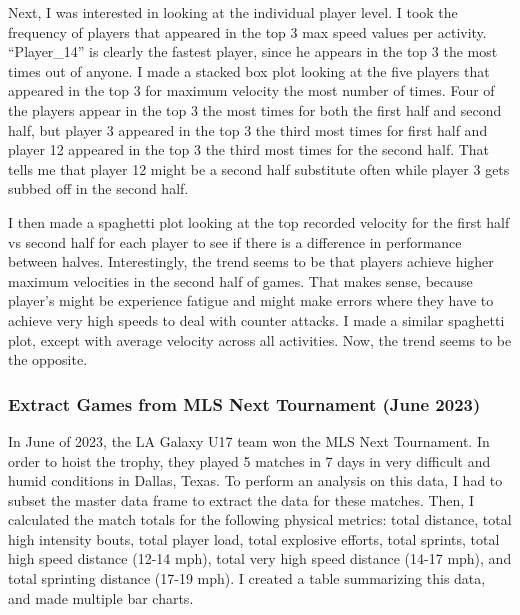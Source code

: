 \documentclass[
  letterpaper,
  DIV=11,
  numbers=noendperiod]{scrartcl}
\begin{document}
Next, I was interested in looking at the individual player level. I took
the frequency of players that appeared in the top 3 max speed values per
activity. ``Player\_14'' is clearly the fastest player, since he appears
in the top 3 the most times out of anyone. I made a stacked box plot
looking at the five players that appeared in the top 3 for maximum
velocity the most number of times. Four of the players appear in the top
3 the most times for both the first half and second half, but player 3
appeared in the top 3 the third most times for first half and player 12
appeared in the top 3 the third most times for the second half. That
tells me that player 12 might be a second half substitute often while
player 3 gets subbed off in the second half.

I then made a spaghetti plot looking at the top recorded velocity for
the first half vs second half for each player to see if there is a
difference in performance between halves. Interestingly, the trend seems
to be that players achieve higher maximum velocities in the second half
of games. That makes sense, because player's might be experience fatigue
and might make errors where they have to achieve very high speeds to
deal with counter attacks. I made a similar spaghetti plot, except with
average velocity across all activities. Now, the trend seems to be the
opposite.

\hypertarget{extract-games-from-mls-next-tournament-june-2023}{%
\subsubsection{Extract Games from MLS Next Tournament (June
2023)}\label{extract-games-from-mls-next-tournament-june-2023}}

In June of 2023, the LA Galaxy U17 team won the MLS Next Tournament. In
order to hoist the trophy, they played 5 matches in 7 days in very
difficult and humid conditions in Dallas, Texas. To perform an analysis
on this data, I had to subset the master data frame to extract the data
for these matches. Then, I calculated the match totals for the following
physical metrics: total distance, total high intensity bouts, total
player load, total explosive efforts, total sprints, total high speed
distance (12-14 mph), total very high speed distance (14-17 mph), and
total sprinting distance (17-19 mph). I created a table summarizing this
data, and made multiple bar charts.
\end{document}
